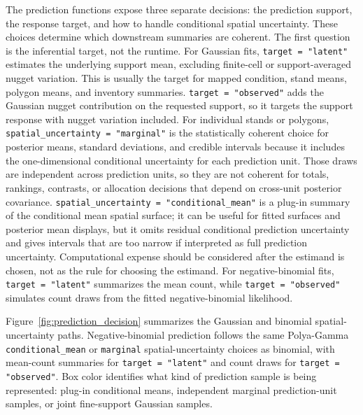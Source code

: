 \documentclass[11pt]{article}
\begin{document}
The prediction functions expose three separate decisions: the prediction
support, the response target, and how to handle conditional spatial
uncertainty. These choices determine which downstream summaries are coherent.
The first question is the inferential target, not the runtime. For Gaussian
fits, \texttt{target = "latent"} estimates the underlying support mean,
excluding finite-cell or support-averaged nugget variation. This is usually
the target for mapped condition, stand means, polygon means, and inventory
summaries. \texttt{target = "observed"} adds the Gaussian nugget contribution
on the requested support, so it targets the support response with nugget
variation included. For individual stands or polygons,
\texttt{spatial\_uncertainty = "marginal"} is the statistically coherent
choice for posterior means, standard deviations, and credible intervals
because it includes the one-dimensional conditional uncertainty for each
prediction unit. Those draws are independent across prediction units, so they
are not coherent for totals, rankings, contrasts, or allocation decisions that
depend on cross-unit posterior covariance.
\texttt{spatial\_uncertainty = "conditional\_mean"} is a plug-in summary of the
conditional mean spatial surface; it can be useful for fitted surfaces and
posterior mean displays, but it omits residual conditional prediction
uncertainty and gives intervals that are too narrow if interpreted as full
prediction uncertainty. Computational expense should be considered after the
estimand is chosen, not as the rule for choosing the estimand.
For negative-binomial fits, \texttt{target = "latent"} summarizes the mean
count, while \texttt{target = "observed"} simulates count draws from the
fitted negative-binomial likelihood.

Figure~\ref{fig:prediction_decision} summarizes the Gaussian and binomial
spatial-uncertainty paths. Negative-binomial prediction follows the same
Polya-Gamma \texttt{conditional\_mean} or \texttt{marginal}
spatial-uncertainty choices as binomial, with mean-count summaries for
\texttt{target = "latent"} and count draws for \texttt{target = "observed"}.
Box color identifies what kind of prediction sample is being represented:
plug-in conditional means, independent marginal prediction-unit samples, or
joint fine-support Gaussian samples.
\end{document}
